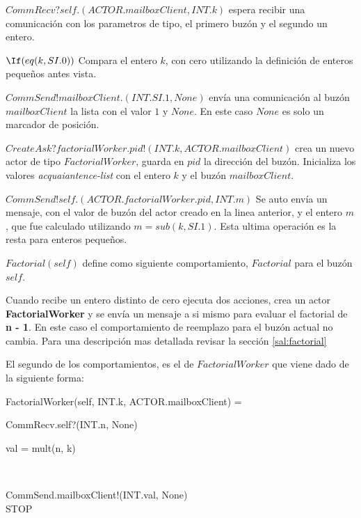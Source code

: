 \begin{description}
 \item $CommRecv?self.(ACTOR.mailboxClient, INT.k)$ espera recibir una comunicación con los parametros de tipo, el primero buzón y el segundo un entero.
 \item $\If (eq(k,SI.0))$ Compara el entero $k$, con cero utilizando la definición de enteros pequeños antes vista.
 \item $CommSend!mailboxClient.(INT.SI.1, None)$ envía una comunicación al buzón $mailboxClient$ la lista con el valor $1$ y $None$. En este caso $None$ es solo un marcador de posición.
 \item $CreateAsk?factorialWorker.pid!(INT.k, ACTOR.mailboxClient)$ crea un nuevo actor de tipo $FactorialWorker$, guarda en $pid$ la dirección del buzón. Inicializa los valores \textit{acquaiantence-list} con el entero $k$ y el buzón $mailboxClient$.
 \item $CommSend!self.(ACTOR.factorialWorker.pid, INT.m)$ Se auto envía un mensaje, con el valor de buzón del actor creado en la linea anterior, y el entero $m$, que fue calculado utilizando $m  = sub(k, SI.1)$. Esta ultima operación es la resta para enteros pequeños.
 \item $Factorial(self)$ define como siguiente comportamiento, $Factorial$ para el buzón $self$.
\end{description}

Cuando recibe un entero distinto de cero ejecuta dos acciones, crea un actor \textbf{FactorialWorker} y se envía un mensaje a si mismo para evaluar el factorial de \textbf{n - 1}. En este caso el comportamiento de reemplazo para el buzón actual no cambia. Para una descripción mas detallada revisar la sección \ref{sal:factorial}

El segundo de los comportamientos, es el de $FactorialWorker$ que viene dado de la siguiente forma:

\begin{process}
FactorialWorker(self, INT.k, ACTOR.mailboxClient) = {} \\ \quad
  \begin{block}
  CommRecv.self?(INT.n, None) \then {} \\ \quad
    \begin{block}
    \begin{declaration}
    val = mult(n, k) 
    \end{declaration} \\
    \begin{within}
    CommSend.mailboxClient!(INT.val, None) \then \\
    STOP
    \end{within}
    \end{block}
  \end{block}
\end{process}

